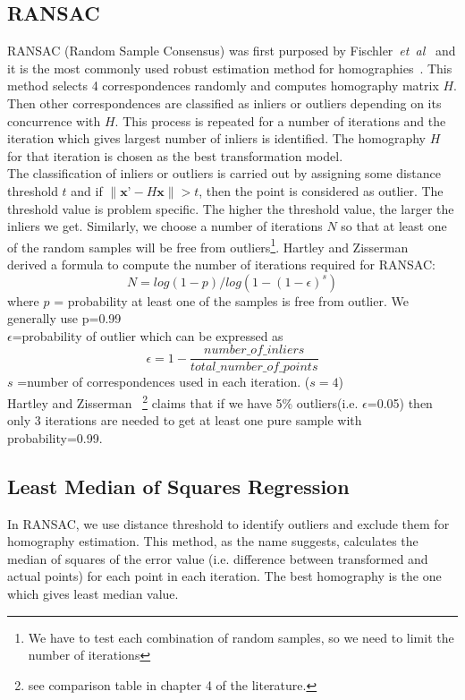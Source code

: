 \subsection{RANSAC}
\label{sec:ransac}
RANSAC (Random Sample Consensus) was first purposed by Fischler~\emph{et~al}~\cite{fischler:81} and it is the most commonly used robust estimation method for homographies~\cite{Dubrofsky:07}. This method selects 4 correspondences randomly and computes homography matrix $H$. Then other correspondences are classified as inliers or outliers depending on its concurrence with $H$. This process is repeated for a number of iterations and the iteration which gives largest number of inliers is identified. The homography $H$ for that iteration is chosen as the best transformation model.\\

\noindent The classification of inliers or outliers is carried out by assigning some distance threshold $t$ and if $\|\textbf{x'} - H\textbf{x}\| > t$, then the point is considered as outlier. The threshold value is problem specific. The higher the threshold value, the larger the inliers we get. Similarly, we choose a number of iterations $N$ so that at least one of the random samples will be free from outliers\footnote{We have to test each combination of random samples, so we need to limit the number of iterations}. Hartley and Zisserman~\cite{hartley:04} derived a formula to compute the number of iterations required for RANSAC:
\begin{equation}
N=log(1-p)/log(1-(1- \epsilon)^s)
\label{eq:number-of-iterations}
\end{equation} 
where $p$ = probability at least one of the samples is free from outlier. We generally use p=0.99\\
$\epsilon$=probability of outlier which can be expressed as 
\begin{equation}
\epsilon= 1- \frac{number\_of\_inliers}{total\_number\_of\_points}
\label{eq:outlier-probability}
\end{equation}
$s$ =number of correspondences used in each iteration. ($s=4$)\\

\noindent Hartley and Zisserman~\cite{hartley:04} \footnote{see comparison table in chapter 4 of the literature.} claims that if we have 5\% outliers(i.e. $\epsilon$=0.05) then only 3 iterations are needed to get at least one pure sample with probability=0.99.

\subsection{Least Median of Squares Regression}
\label{sec:least-median-square}
In RANSAC, we use distance threshold to identify outliers and exclude them for homography estimation. This method, as the name suggests, calculates the median of squares of the error value (i.e. difference between transformed and actual points) for each point in each iteration. The best homography is the one which gives least median value.\\

